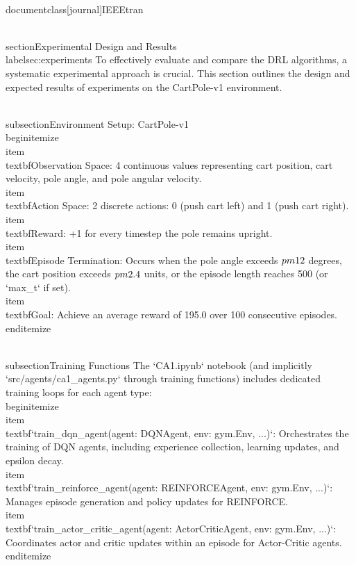 \\documentclass[journal]{IEEEtran}
\begin{document}
\\section{Experimental Design and Results}
\\label{sec:experiments}
To effectively evaluate and compare the DRL algorithms, a systematic experimental approach is crucial. This section outlines the design and expected results of experiments on the CartPole-v1 environment.

\\subsection{Environment Setup: CartPole-v1}
\\begin{itemize}
    \\item \\textbf{Observation Space}: 4 continuous values representing cart position, cart velocity, pole angle, and pole angular velocity.
    \\item \\textbf{Action Space}: 2 discrete actions: 0 (push cart left) and 1 (push cart right).
    \\item \\textbf{Reward}: +1 for every timestep the pole remains upright.
    \\item \\textbf{Episode Termination}: Occurs when the pole angle exceeds $\\pm 12$ degrees, the cart position exceeds $\\pm 2.4$ units, or the episode length reaches 500 (or `max_t` if set).
    \\item \\textbf{Goal}: Achieve an average reward of 195.0 over 100 consecutive episodes.
\\end{itemize}

\\subsection{Training Functions}
The `CA1.ipynb` notebook (and implicitly `src/agents/ca1_agents.py` through training functions) includes dedicated training loops for each agent type:
\\begin{itemize}
    \\item \\textbf{`train_dqn_agent(agent: DQNAgent, env: gym.Env, ...)`}: Orchestrates the training of DQN agents, including experience collection, learning updates, and epsilon decay.
    \\item \\textbf{`train_reinforce_agent(agent: REINFORCEAgent, env: gym.Env, ...)`}: Manages episode generation and policy updates for REINFORCE.
    \\item \\textbf{`train_actor_critic_agent(agent: ActorCriticAgent, env: gym.Env, ...)`}: Coordinates actor and critic updates within an episode for Actor-Critic agents.
\\end{itemize}
\end{document}
